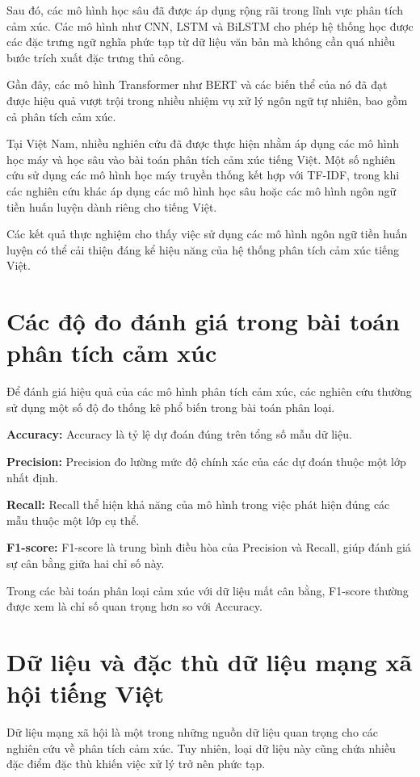 \documentclass[14pt, a4paper]{report}
\begin{document}
Sau đó, các mô hình học sâu đã được áp dụng rộng rãi trong lĩnh vực phân tích cảm xúc. Các mô hình như CNN, LSTM và BiLSTM cho phép hệ thống học được các đặc trưng ngữ nghĩa phức tạp từ dữ liệu văn bản mà không cần quá nhiều bước trích xuất đặc trưng thủ công.

Gần đây, các mô hình Transformer như BERT và các biến thể của nó đã đạt được hiệu quả vượt trội trong nhiều nhiệm vụ xử lý ngôn ngữ tự nhiên, bao gồm cả phân tích cảm xúc.

Tại Việt Nam, nhiều nghiên cứu đã được thực hiện nhằm áp dụng các mô hình học máy và học sâu vào bài toán phân tích cảm xúc tiếng Việt. Một số nghiên cứu sử dụng các mô hình học máy truyền thống kết hợp với TF-IDF, trong khi các nghiên cứu khác áp dụng các mô hình học sâu hoặc các mô hình ngôn ngữ tiền huấn luyện dành riêng cho tiếng Việt.

Các kết quả thực nghiệm cho thấy việc sử dụng các mô hình ngôn ngữ tiền huấn luyện có thể cải thiện đáng kể hiệu năng của hệ thống phân tích cảm xúc tiếng Việt.

\section{Các độ đo đánh giá trong bài toán phân tích cảm xúc}

Để đánh giá hiệu quả của các mô hình phân tích cảm xúc, các nghiên cứu thường sử dụng một số độ đo thống kê phổ biến trong bài toán phân loại.

\textbf{Accuracy:} Accuracy là tỷ lệ dự đoán đúng trên tổng số mẫu dữ liệu.

\textbf{Precision:} Precision đo lường mức độ chính xác của các dự đoán thuộc một lớp nhất định.

\textbf{Recall:} Recall thể hiện khả năng của mô hình trong việc phát hiện đúng các mẫu thuộc một lớp cụ thể.

\textbf{F1-score:} F1-score là trung bình điều hòa của Precision và Recall, giúp đánh giá sự cân bằng giữa hai chỉ số này.

Trong các bài toán phân loại cảm xúc với dữ liệu mất cân bằng, F1-score thường được xem là chỉ số quan trọng hơn so với Accuracy.

\section{Dữ liệu và đặc thù dữ liệu mạng xã hội tiếng Việt}

Dữ liệu mạng xã hội là một trong những nguồn dữ liệu quan trọng cho các nghiên cứu về phân tích cảm xúc. Tuy nhiên, loại dữ liệu này cũng chứa nhiều đặc điểm đặc thù khiến việc xử lý trở nên phức tạp.
\end{document}

